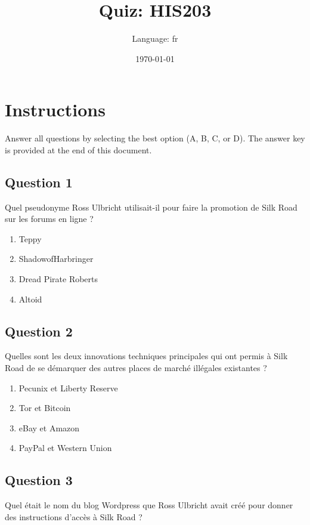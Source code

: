 \documentclass[12pt,a4paper]{article}
\title{Quiz: HIS203}
\author{Language: fr}
\date{\today}
\begin{document}
\maketitle
\thispagestyle{fancy}

\section*{Instructions}
Answer all questions by selecting the best option (A, B, C, or D). The answer key is provided at the end of this document.

\bigskip


\subsection*{Question 1}
Quel pseudonyme Ross Ulbricht utilisait-il pour faire la promotion de Silk Road sur les forums en ligne ?

\begin{enumerate}[label=\Alph*., leftmargin=*]
\item Teppy
\item ShadowofHarbringer
\item Dread Pirate Roberts
\item Altoid
\end{enumerate}

\bigskip


\subsection*{Question 2}
Quelles sont les deux innovations techniques principales qui ont permis à Silk Road de se démarquer des autres places de marché illégales existantes ?

\begin{enumerate}[label=\Alph*., leftmargin=*]
\item Pecunix et Liberty Reserve
\item Tor et Bitcoin
\item eBay et Amazon
\item PayPal et Western Union
\end{enumerate}

\bigskip


\subsection*{Question 3}
Quel était le nom du blog Wordpress que Ross Ulbricht avait créé pour donner des instructions d'accès à Silk Road ?
\end{document}
